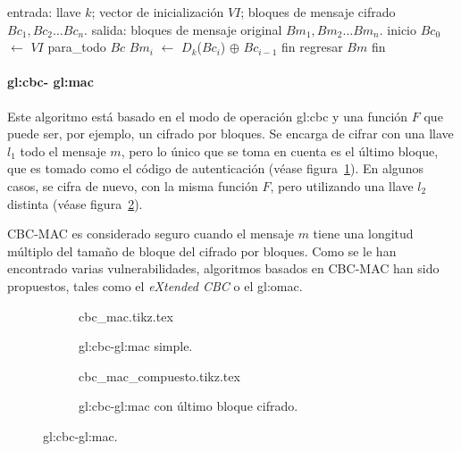 \begin{pseudocodigo}[%
    caption={\Gls{gl:modo_de_operacion} \acrshort{gl:cbc}, descifrado.},
    label={cbc:2}%
  ]
    entrada: llave $ k $; vector de inicialización $ VI $;
             bloques de mensaje cifrado $ Bc_1, Bc_2 \dots Bc_n $.
    salida:  bloques de mensaje original $ Bm_1, Bm_2 \dots Bm_n $.
    inicio
      $Bc_0$ $\gets$ $ VI $
      para_todo $Bc$
        $Bm_i$ $\gets$ $D_k$($Bc_i$) $\oplus$ $Bc_{i-1}$
      fin
      regresar $Bm$
    fin
\end{pseudocodigo}

\paragraph{\texorpdfstring{\acrshort{gl:cbc}}{CBC}-%
  \texorpdfstring{\acrshort{gl:mac}}{MAC}}

Este algoritmo está basado en el modo de operación \gls{gl:cbc} y una función
$F$ que puede ser, por ejemplo, un cifrado por bloques. Se encarga de
cifrar con una llave $l_1$ todo el mensaje $m$, pero lo único que se toma en
cuenta es el último bloque, que es tomado como el código de autenticación
(véase figura~\ref{mac:cbc1}). En algunos casos, se cifra de nuevo, con la
misma función $F$, pero utilizando una llave $l_2$ distinta (véase
figura~\ref{mac:cbc2}).

CBC-MAC es considerado seguro cuando el mensaje $m$ tiene una longitud
múltiplo del tamaño de bloque del cifrado por bloques. Como se le han
encontrado varias vulnerabilidades, algoritmos basados en CBC-MAC han sido
propuestos, tales como el \textit{eXtended CBC} o el \gls{gl:omac}.

\begin{figure}
  \centering
  \begin{subfigure}{0.45\textwidth}
    \begin{center}
      {cbc_mac.tikz.tex}
      \caption{\acrshort{gl:cbc}-\acrshort{gl:mac} simple.}
      \label{mac:cbc1}
    \end{center}
  \end{subfigure}
  \begin{subfigure}{0.45\textwidth}
    \begin{center}
      {cbc_mac_compuesto.tikz.tex}
      \caption{\acrshort{gl:cbc}-\acrshort{gl:mac} con último bloque cifrado.}
      \label{mac:cbc2}
    \end{center}
  \end{subfigure}
  \caption{\acrshort{gl:cbc}-\acrshort{gl:mac}.}
  \label{figura:cbc_mac}
\end{figure}
